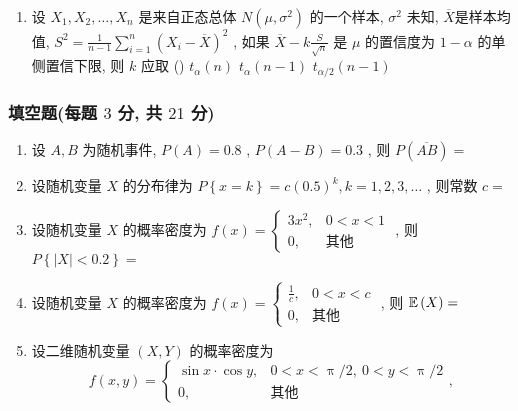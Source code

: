 \begin{enumerate}
	\item 设 $X_1,X_2,\ldots,X_n$ 是来自正态总体 $N\left(\mu,\sigma^2\right)$ 的一个样本, $\sigma^2$ 未知, $\overline{X}$是样本均值, $S^2=\frac{1}{n-1}\sum_{i=1}^{n}\left(X_i-\overline{X}\right)^2$ , 如果 $\overline{X}-k\frac{S}{\sqrt{n}}$ 是 $\mu$ 的置信度为 $1-\alpha$ 的单侧置信下限, 则 $k$ 应取 (\hspace{1pc})
	{$t_{\alpha}(n)$}
	{$t_{\alpha}(n-1)$}
	{$t_{\alpha/2}(n-1)$}	
\end{enumerate}

\subsubsection{填空题(每题 $3$ 分, 共 $21$ 分)}
\begin{enumerate}
	\item 设 $A,B$ 为随机事件, $P(A)=0.8$ , $P(A-B)=0.3$ , 则 $P\left(\overline{AB}\right)=$\underline{\hspace{8pc}}
	
	\item 设随机变量 $X$ 的分布律为 $P\left\{x=k\right\}=c(0.5)^k,k=1,2,3,\ldots$ , 则常数 $c=$\underline{\hspace{8pc}}
	
	\item 设随机变量 $X$ 的概率密度为 $f(x)=
	\begin{cases}
	3x^2, & 0<x<1\\
	0, & \text{其他}
	\end{cases}
	$ , 则 $P\left\{\left|X\right|<0.2\right\}=$\underline{\hspace{8pc}}
	
	\item 设随机变量 $X$ 的概率密度为 $f(x)=
	\begin{cases}
	\frac{1}{c}, & 0<x<c\\
	0, & \text{其他}
	\end{cases}
	$ , 则 $\mathbb{E}\,(X)=$\underline{\hspace{8pc}}
	
	\item 设二维随机变量 $(X,Y)$ 的概率密度为
	\begin{equation*}
		f(x,y)=
		\begin{cases}
		\sin x\cdot\cos y, & 0<x<\uppi/2,\ 0<y<\uppi/2\\
		0, & \text{其他}
		\end{cases}
		,
	\end{equation*}
	

\end{enumerate}
